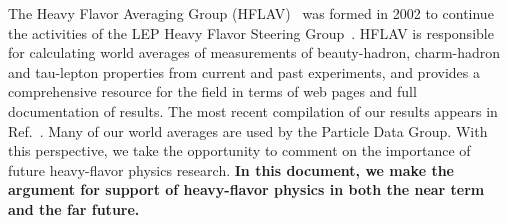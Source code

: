 \documentclass[12pt,a4paper]{article}
\begin{document}
\renewcommand{\thefootnote}{\arabic{footnote}}
\setcounter{footnote}{0}



\parskip=2mm

\noindent 
The Heavy Flavor Averaging Group (HFLAV)~\cite{HFLAV-web} was formed in 2002 to 
continue the activities of the LEP Heavy Flavor Steering 
Group~\cite{Abbaneo:2001bv_mod_cont}. 
HFLAV is responsible for calculating world averages of measurements of 
beauty-hadron, charm-hadron and tau-lepton properties from current and 
past experiments, and provides a comprehensive resource for the field in terms of web pages 
and full documentation of results. The most recent compilation of our results appears in Ref.~\cite{HFLAV16}. Many of our world averages are used by the Particle Data Group. 
With this perspective, we take the opportunity to comment on the importance of future heavy-flavor physics research. \textbf{In this document, we make the argument for support of heavy-flavor physics in both the near term and the far future.} 
\end{document}
